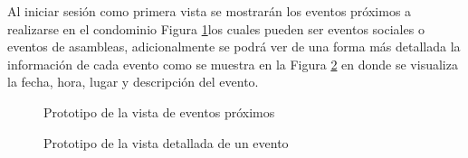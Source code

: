 Al iniciar sesión como primera vista se mostrarán los eventos próximos a realizarse en el condominio Figura \ref{fig:login-eventos}los cuales pueden ser eventos sociales o eventos de asambleas, adicionalmente se podrá ver de una forma más detallada la información de cada evento como se muestra en la Figura \ref{fig:login-eventos-detalle} en donde se visualiza la fecha, hora, lugar y descripción del evento.

\begin{figure}[H]
    \centering
    \caption{Prototipo de la vista de eventos próximos}
    \label{fig:login-eventos}
\end{figure}


\begin{figure}[H]
    \centering
    \caption{Prototipo de la vista detallada de un evento}
    \label{fig:login-eventos-detalle}
\end{figure}

